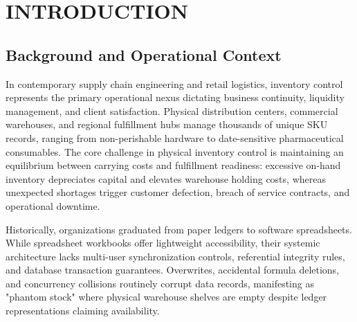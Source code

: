 \documentclass[BTech]{srmuthesis}
\begin{document}
\pagebreak
\clearpage
{}

\chapter{INTRODUCTION}
\label{chap:intro}

\section{Background and Operational Context}
In contemporary supply chain engineering and retail logistics, inventory control represents the primary operational nexus dictating business continuity, liquidity management, and client satisfaction. Physical distribution centers, commercial warehouses, and regional fulfillment hubs manage thousands of unique \ac{SKU} records, ranging from non-perishable hardware to date-sensitive pharmaceutical consumables. The core challenge in physical inventory control is maintaining an equilibrium between carrying costs and fulfillment readiness: excessive on-hand inventory depreciates capital and elevates warehouse holding costs, whereas unexpected shortages trigger customer defection, breach of service contracts, and operational downtime.

Historically, organizations graduated from paper ledgers to software spreadsheets. While spreadsheet workbooks offer lightweight accessibility, their systemic architecture lacks multi-user synchronization controls, referential integrity rules, and database transaction guarantees. Overwrites, accidental formula deletions, and concurrency collisions routinely corrupt data records, manifesting as "phantom stock" where physical warehouse shelves are empty despite ledger representations claiming availability.
\end{document}
